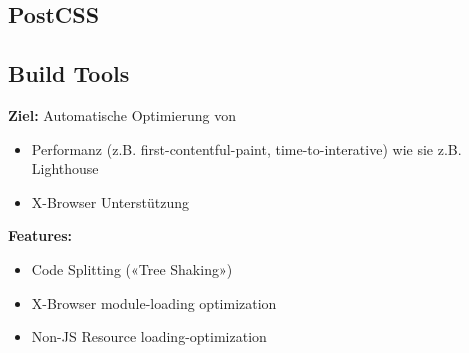 \subsection{PostCSS}

\subsection{Build Tools}
\textbf{Ziel:} Automatische Optimierung von
\begin{itemize}
    \item Performanz (z.B. first-contentful-paint, time-to-interative) wie sie z.B. Lighthouse
    \item X-Browser Unterstützung
\end{itemize}
\textbf{Features:}
\begin{itemize}
    \item Code Splitting («Tree Shaking»)
    \item X-Browser module-loading optimization
    \item Non-JS Resource loading-optimization
\end{itemize}

\vfill